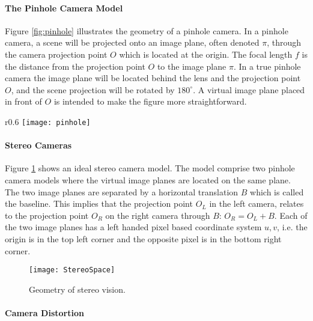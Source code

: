 \paragraph{The Pinhole Camera Model}

Figure \ref{fig:pinhole} illustrates the geometry of a pinhole camera. In a pinhole camera, a scene will be projected onto an image plane, often denoted $\pi$, through the camera projection point $O$ which is located at the origin. The focal length $f$ is the distance from the projection point $O$ to the image plane $\pi$. In a true pinhole camera the image plane will be located behind the lens and the projection point $O$, and the scene projection will be rotated by $180^{\circ}$. A virtual image plane placed in front of $O$ is intended to make the figure more straightforward. 

\begin{wrapfigure}{r}{0.6\textwidth}
    \vspace{-10pt} %
    \centering
    \texttt{[image: pinhole]}
    \caption{\label{fig:pinhole}Geometry of a pinhole camera.}
    \vspace{-10pt} %
    \label{phantompic}
\end{wrapfigure}

\paragraph{Stereo Cameras}

Figure \ref{fig:StereoSpace} shows an ideal stereo camera model.  The model comprise two pinhole camera models where the virtual image planes are located on the same plane. The two image planes are separated by a horizontal translation $B$ which is called the baseline. This implies that the projection point $O_L$  in the left camera, relates to the projection point $O_R$ on the right camera through $B$: $O_R = O_L + B$. Each of the two image planes has a left handed pixel based coordinate system $u,v$, i.e. the origin is in the top left corner and the opposite pixel is in the bottom right corner. 

\begin{figure}
\centering
\texttt{[image: StereoSpace]}
\caption{\label{fig:StereoSpace}Geometry of stereo vision.}
\end{figure}

\paragraph{Camera Distortion}

